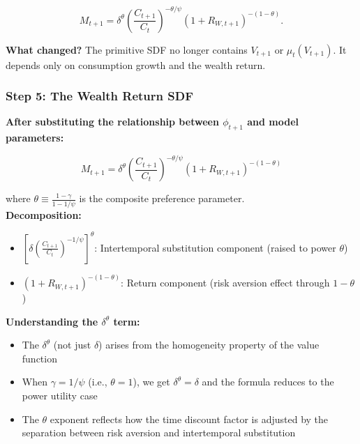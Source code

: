 \documentclass{beamer}
\begin{document}
\begin{frame}[allowframebreaks]
    \begin{tcolorbox}[colback=green!5!white, colframe=green!75!black, title=Result of Step 4]
    \begin{equation*}
    	M_{t+1}
        = \delta^{\theta}
        \left(\frac{C_{t+1}}{C_t}\right)^{-\theta/\psi}
        (1+R_{W,t+1})^{-(1-\theta)}.
    \end{equation*}
    \end{tcolorbox}
    \textbf{What changed?} The primitive SDF no longer contains $V_{t+1}$ or $\mu_t(V_{t+1})$. It depends only on consumption growth and the wealth return.
\end{frame}

\begin{frame}[allowframebreaks]
    \frametitle{Step 5: The Wealth Return SDF}
    
    \textbf{After substituting the relationship between $\phi_{t+1}$ and model parameters:}
    
    \begin{tcolorbox}[colback=blue!5!white, colframe=blue!75!black, title=Wealth Return Form of Epstein-Zin SDF]
    \begin{equation*}
        M_{t+1} = \delta^{\theta} \left( \frac{C_{t+1}}{C_t} \right)^{-\theta/\psi} (1 + R_{W,t+1})^{-(1-\theta)}
    \end{equation*}
    \end{tcolorbox}
    
    where $\theta \equiv \frac{1-\gamma}{1-1/\psi}$ is the composite preference parameter. \\

    \textbf{Decomposition:}
    \begin{itemize}
        \item $\left[\delta \left( \frac{C_{t+1}}{C_t} \right)^{-1/\psi}\right]^{\theta}$: Intertemporal substitution component (raised to power $\theta$)
        \item $(1 + R_{W,t+1})^{-(1-\theta)}$: Return component (risk aversion effect through $1-\theta$)
    \end{itemize}
    
    \framebreak
    
    \textbf{Understanding the $\delta^{\theta}$ term:}
    
    \begin{itemize}
        \item The $\delta^{\theta}$ (not just $\delta$) arises from the homogeneity property of the value function
        \item When $\gamma = 1/\psi$ (i.e., $\theta = 1$), we get $\delta^{\theta} = \delta$ and the formula reduces to the power utility case
        \item The $\theta$ exponent reflects how the time discount factor is adjusted by the separation between risk aversion and intertemporal substitution
    \end{itemize}
    

\end{frame}
\end{document}
